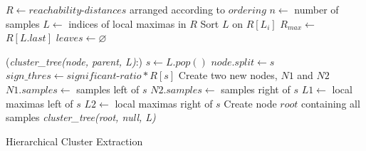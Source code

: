 \documentclass[a4paper]{report}
\begin{document}
{
    \fontsize{10}{12}
    \selectfont
    \begin{algorithm}[t]
        \DontPrintSemicolon
        \BlankLine
        \BlankLine

        $R \gets reachability$-$distances$ arranged according to $ordering$\;
        $n \gets$ number of samples\;
        $L \gets$ indices of local maximas in $R$\;
        Sort $L$ on $R[L_i]$\;
        $R_{max} \gets$ $R[L.last]$\;
        $leaves \gets \varnothing$\;

        \Fn(\emph{cluster\_tree(node, parent, L)}:){
            $s \gets L.pop()$\;
            $node.split \gets s$\;
            $sign\_thres \gets significant$-$ratio * R[s]$\;
            Create two new nodes, $N1$ and $N2$\;
            $N1.samples \gets$ samples left of $s$\;
            $N2.samples \gets$ samples right of $s$\;
            $L1 \gets $ local maximas left of $s$\;
            $L2 \gets $ local maximas right of $s$\;
        }
        \BlankLine
        Create node $root$ containing all samples\;
        \emph{cluster\_tree(root, null, L)}\;
        \BlankLine
        \caption{Hierarchical Cluster Extraction}
        \label{alg:hierextr}
    \end{algorithm}
}
\end{document}
